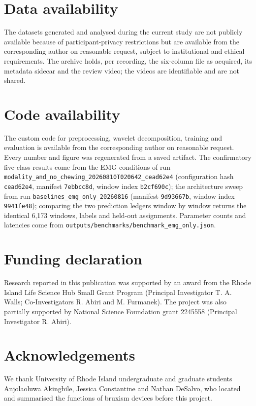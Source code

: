 \documentclass[pdflatex,sn-nature,iicol]{sn-jnl}
\begin{document}
\section*{Data availability}
The datasets generated and analysed during the current study are not publicly available because of participant-privacy restrictions but are available from the corresponding author on reasonable request, subject to institutional and ethical requirements. The archive holds, per recording, the six-column file as acquired, its metadata sidecar and the review video; the videos are identifiable and are not shared.

\section*{Code availability}
The custom code for preprocessing, wavelet decomposition, training and evaluation is available from the corresponding author on reasonable request. Every number and figure was regenerated from a saved artifact. The confirmatory five-class results come from the EMG conditions of run \texttt{modality\_and\_no\_chewing\_}\allowbreak\texttt{20260810T020642\_cead62e4} (configuration hash \texttt{cead62e4}, manifest \texttt{7ebbcc8d}, window index \texttt{b2cf690c}); the architecture sweep from run \texttt{baselines\_emg\_only\_20260816} (manifest \texttt{9d93667b}, window index \texttt{9941fe48}); comparing the two prediction ledgers window by window returns the identical 6,173 windows, labels and held-out assignments. Parameter counts and latencies come from \texttt{outputs/benchmarks/}\allowbreak\texttt{benchmark\_emg\_only.json}.

\section*{Funding declaration}
Research reported in this publication was supported by an award from the Rhode Island Life Science Hub Small Grant Program (Principal Investigator T. A. Walls; Co-Investigators R. Abiri and M. Furmanek). The project was also partially supported by National Science Foundation grant 2245558 (Principal Investigator R. Abiri).

\section*{Acknowledgements}
We thank University of Rhode Island undergraduate and graduate students Anjolaoluwa Akingbile, Jessica Constantine and Nathan DeSalvo, who located and summarised the functions of bruxism devices before this project.
\end{document}
